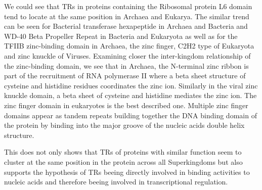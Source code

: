 \documentclass[a4,center,fleqn]{NAR}
\begin{document}
We could see that TRs in proteins containing the Ribosomal protein L6 domain tend to locate at the same position in Archaea and Eukarya. The similar trend can be seen for Bacterial transferase hexapeptide in Archaea and Bacteria and WD-40 Beta Propeller Repeat in Bacteria and Eukaryota as well as for the TFIIB zinc-binding domain in Archaea, the zinc finger, C2H2 type of Eukaryota and zinc knuckle of Viruses.
Examining closer the inter-kingdom relationship of the zinc-binding domain, we see that in Archaea, the N-terminal zinc ribbon is part of the recruitment of RNA polymerase II where a beta sheet structure of cysteine and histidine residues coordinates the zinc ion.
Similarly in the viral zinc knuckle domain, a beta sheet of cysteine and histidine mediates the zinc ion. 
The zinc finger domain in eukaryotes is the best described one. Multiple zinc finger domains appear as tandem repeats building together the DNA binding domain of the protein by binding into the major groove of the nucleic acids double helix structure. 

This does not only shows that TRs of proteins with similar function seem to cluster at the same position in the protein across all Superkingdoms 
but also supports the hypothesis of TRs beeing directly involved in binding activities to nucleic acids and therefore beeing involved in transcriptional regulation.
\end{document}
